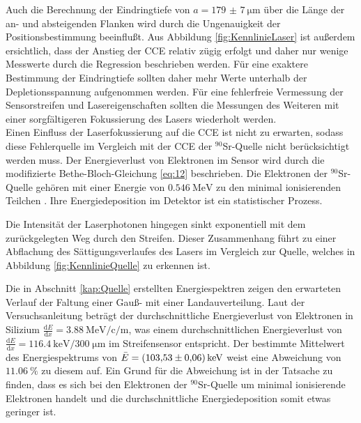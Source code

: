 Auch die Berechnung der Eindringtiefe von $a= \SI{179(7)}{\micro\metre}$ über die Länge der an- und absteigenden Flanken wird durch die Ungenauigkeit der Positionsbestimmung beeinflußt.
Aus Abbildung \ref{fig:KennlinieLaser} ist außerdem ersichtlich, dass der Anstieg der CCE relativ zügig erfolgt und daher nur wenige Messwerte durch die Regression beschrieben werden. Für eine exaktere Bestimmung der Eindringtiefe sollten daher mehr Werte unterhalb der Depletionsspannung aufgenommen werden.
Für eine fehlerfreie Vermessung der Sensorstreifen und Lasereigenschaften sollten die Messungen des Weiteren mit einer sorgfältigeren Fokussierung des Lasers wiederholt werden.\\

Einen Einfluss der Laserfokussierung auf die CCE ist nicht zu erwarten, sodass diese Fehlerquelle im Vergleich mit der CCE der $^{90}$Sr-Quelle nicht berücksichtigt werden muss.
Der Energieverlust von Elektronen im Sensor wird durch die modifizierte Bethe-Bloch-Gleichung \ref{eq:12} beschrieben. Die Elektronen der $^{90}$Sr-Quelle gehören mit einer Energie von $\SI{0.546}{\mega\electronvolt}$ zu den minimal ionisierenden Teilchen \cite{periodensystem}. Ihre Energiedeposition im Detektor ist ein statistischer Prozess.

Die Intensität der Laserphotonen hingegen sinkt exponentiell mit dem zurückgelegten Weg durch den Streifen. Dieser Zusammenhang führt zu einer Abflachung des Sättigungsverlaufes des Lasers im Vergleich zur Quelle, welches in Abbildung \ref{fig:KennlinieQuelle} zu erkennen ist.

Die in Abschnitt \ref{kap:Quelle} erstellten Energiespektren zeigen den erwarteten Verlauf der Faltung einer Gauß- mit einer Landauverteilung. Laut der Versuchsanleitung \cite{anleitung} beträgt der durchschnittliche Energieverlust von Elektronen in Silizium $\frac{\mathrm{d}E}{\mathrm{d}x} = \SI{3.88}{\mega\electronvolt\per\centi \per \metre}$, was einem durchschnittlichen Energieverlust von $\frac{\mathrm{d}E}{\mathrm{d}x} = \SI{116.4}{\kilo\electronvolt\per 300\; \micro \metre}$ im Streifensensor entspricht. Der bestimmte Mittelwert des Energiespektrums von $\bar{E} = \SI{103.53 \pm 0.06}{\kilo\electronvolt}$ weist eine Abweichung von $\SI{11.06}{\%}$ zu diesem auf. Ein Grund für die Abweichung ist in der Tatsache zu finden, dass es sich bei den Elektronen der $^{90}$Sr-Quelle um minimal ionisierende Elektronen handelt und die durchschnittliche Energiedeposition somit etwas geringer ist.
